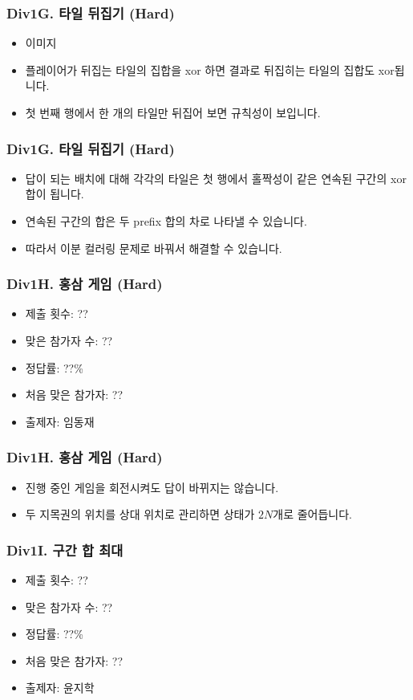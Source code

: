 \documentclass[xetex]{beamer}
\begin{document}
\begin{frame}
  \frametitle{Div1G. 타일 뒤집기 (Hard)}
  \begin{itemize}
    \item 이미지
    \item 플레이어가 뒤집는 타일의 집합을 xor 하면 결과로 뒤집히는 타일의 집합도 xor됩니다.
    \item 첫 번째 행에서 한 개의 타일만 뒤집어 보면 규칙성이 보입니다.
  \end{itemize}
\end{frame}

\begin{frame}
  \frametitle{Div1G. 타일 뒤집기 (Hard)}
  \begin{itemize}
    \item 답이 되는 배치에 대해 각각의 타일은 첫 행에서 홀짝성이 같은 연속된 구간의 xor 합이 됩니다.
    \item 연속된 구간의 합은 두 prefix 합의 차로 나타낼 수 있습니다.
    \item 따라서 이분 컬러링 문제로 바꿔서 해결할 수 있습니다.
  \end{itemize}
\end{frame}

\begin{frame}
  \frametitle{Div1H. 홍삼 게임 (Hard)}
  \begin{itemize}
    \item 제출 횟수: ??
    \item 맞은 참가자 수: ??
    \item 정답률: ??\%
    \item 처음 맞은 참가자: ??
    \item 출제자: 임동재
  \end{itemize}
\end{frame}

\begin{frame}
  \frametitle{Div1H. 홍삼 게임 (Hard)}
  \begin{itemize}
    \item 진행 중인 게임을 회전시켜도 답이 바뀌지는 않습니다.
    \item 두 지목권의 위치를 상대 위치로 관리하면 상태가 $2N$개로 줄어듭니다.
  \end{itemize}
\end{frame}

\begin{frame}
  \frametitle{Div1I. 구간 합 최대}
  \begin{itemize}
    \item 제출 횟수: ??
    \item 맞은 참가자 수: ??
    \item 정답률: ??\%
    \item 처음 맞은 참가자: ??
    \item 출제자: 윤지학
  \end{itemize}
\end{frame}
\end{document}
